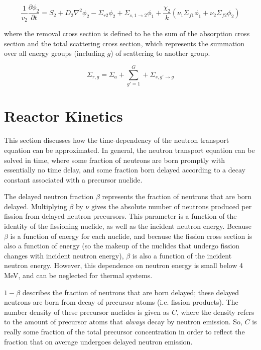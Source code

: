\documentclass[10pt]{article}
\begin{document}
\begin{flushleft}
\begin{equation}
\label{Group2}
\frac{1}{v_2}\frac{\partial\phi_2}{\partial t}=S_2 + D_2\nabla^2\phi_2-\Sigma_{r2}\phi_2+\Sigma_{s, 1\rightarrow 2}\phi_1+\frac{\chi_2}{k}\left(\nu_1\Sigma_{f1}\phi_1+\nu_2\Sigma_{f2}\phi_2\right)
\end{equation}

where the removal cross section is defined to be the sum of the absorption cross section and the total scattering cross section, which represents the summation over all energy groups (including \(g\)) of scattering to another group. 

\begin{equation}
\label{RemovalCrossSection}
\Sigma_{r,g}=\Sigma_a+\sum_{g'=1}^{G}+\Sigma_{s, g'\rightarrow g}
\end{equation}










\clearpage
\section{Reactor Kinetics}

This section discusses how the time-dependency of the neutron transport equation can be approximated. In general, the neutron transport equation can be solved in time, where some fraction of neutrons are born promptly with essentially no time delay, and some fraction born delayed according to a decay constant associated with a precursor nuclide. 

The delayed neutron fraction \(\beta\) represents the fraction of neutrons that are born delayed. Multiplying \(\beta\) by \(\nu\) gives the absolute number of neutrons produced per fission from delayed neutron precursors. This parameter is a function of the identity of the fissioning nuclide, as well as the incident neutron energy. Because \(\beta\) is a function of energy for each nuclide, and because the fission cross section is also a function of energy (so the makeup of the nuclides that undergo fission changes with incident neutron energy), \(\beta\) is also a function of the incident neutron energy. However, this dependence on neutron energy is small below 4 MeV, and can be neglected for thermal systems.

\(1-\beta\) describes the fraction of neutrons that are born delayed; these delayed neutrons are born from decay of precursor atoms (i.e. fission products). The number density of these precursor nuclides is given as \(C\), where the density refers to the amount of precursor atoms that {\it always} decay by neutron emission. So, \(C\) is really some fraction of the total precursor concentration in order to reflect the fraction that on average undergoes delayed neutron emission. 


\end{flushleft}
\end{document}

